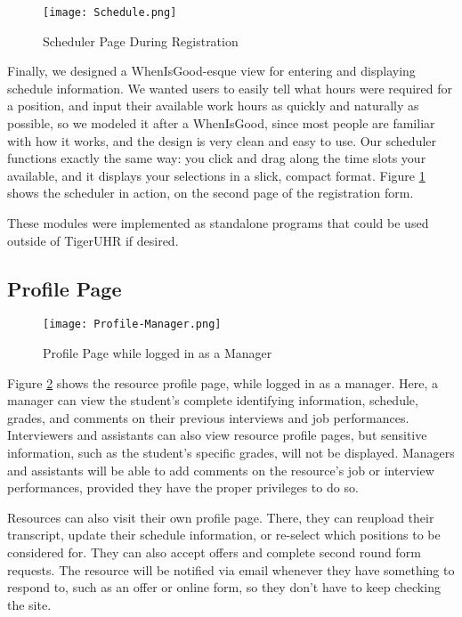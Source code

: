 \begin{figure}[!htbp]
    \centering
    \texttt{[image: Schedule.png]}
    \caption{Scheduler Page During Registration}
    \label{fig:scheduler}
\end{figure}

Finally, we designed a WhenIsGood-esque view for entering and displaying schedule information. We wanted users to easily tell what hours were required for a position, and input their available work hours as quickly and naturally as possible, so we modeled it after a WhenIsGood, since most people are familiar with how it works, and the design is very clean and easy to use. Our scheduler functions exactly the same way: you click and drag along the time slots your available, and it displays your selections in a slick, compact format. Figure \ref{fig:scheduler} shows the scheduler in action, on the second page of the registration form.

These modules were implemented as standalone programs that could be used outside of TigerUHR if desired.

\subsection{Profile Page}

\begin{figure}[!htbp]
    \centering
    \texttt{[image: Profile-Manager.png]}
    \caption{Profile Page while logged in as a Manager}
    \label{fig:profile-manager}
\end{figure}

Figure \ref{fig:profile-manager} shows the resource profile page, while logged in as a manager. Here, a manager can view the student's complete identifying information, schedule, grades, and comments on their previous interviews and job performances. Interviewers and assistants can also view resource profile pages, but sensitive information, such as the student's specific grades, will not be displayed. Managers and assistants will be able to add comments on the resource's job or interview performances, provided they have the proper privileges to do so.

Resources can also visit their own profile page. There, they can reupload their transcript, update their schedule information, or re-select which positions to be considered for. They can also accept offers and complete second round form requests. The resource will be notified via email whenever they have something to respond to, such as an offer or online form, so they don't have to keep checking the site.

